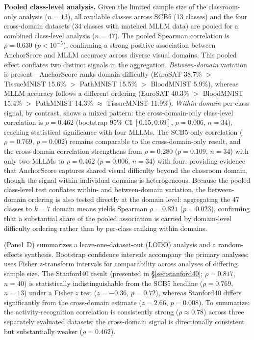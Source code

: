 \documentclass[a4paper,fleqn]{cas-sc}
\begin{document}
\textbf{Pooled class-level analysis.} Given the limited sample size of the classroom-only analysis ($n=13$), all available classes across SCB5 (13 classes) and the four cross-domain datasets (34 classes with matched MLLM data) are pooled for a combined class-level analysis ($n=47$). The pooled Spearman correlation is $\rho=0.630$ ($p<10^{-5}$), confirming a strong positive association between AnchorScore and MLLM accuracy across diverse visual domains. This pooled effect conflates two distinct signals in the aggregation. \emph{Between-domain} variation is present---AnchorScore ranks domain difficulty (EuroSAT 38.7\% $>$ TissueMNIST 15.6\% $>$ PathMNIST 15.5\% $>$ BloodMNIST 5.9\%), whereas MLLM accuracy follows a different ordering (EuroSAT 40.3\% $>$ BloodMNIST 15.4\% $>$ PathMNIST 14.3\% $\approx$ TissueMNIST 11.9\%). \emph{Within-domain} per-class signal, by contrast, shows a mixed pattern: the cross-domain-only class-level correlation is $\rho=0.462$ (bootstrap 95\% CI $[0.15, 0.69]$, $p=0.006$, $n=34$), reaching statistical significance with four MLLMs. The SCB5-only correlation ($\rho=0.769$, $p=0.002$) remains comparable to the cross-domain-only result, and the cross-domain correlation strengthens from $\rho=0.280$ ($p=0.109$, $n=34$) with only two MLLMs to $\rho=0.462$ ($p=0.006$, $n=34$) with four, providing evidence that AnchorScore captures shared visual difficulty beyond the classroom domain, though the signal within individual domains is heterogeneous. Because the pooled class-level test conflates within- and between-domain variation, the between-domain ordering is also tested directly at the domain level: aggregating the 47 classes to $k=7$ domain means yields Spearman $\rho=0.821$ ($p=0.023$), confirming that a substantial share of the pooled association is carried by domain-level difficulty ordering rather than by per-class ranking within domains.

 (Panel~D) summarizes a leave-one-dataset-out (LODO) analysis and a random-effects synthesis. Bootstrap confidence intervals accompany the primary analyses;  uses Fisher $z$-transform intervals for comparability across analyses of differing sample size. The Stanford40 result (presented in \S\ref{sec:stanford40}; $\rho=0.817$, $n=40$) is statistically indistinguishable from the SCB5 headline ($\rho=0.769$, $n=13$) under a Fisher $z$ test ($z=-0.36$, $p=0.72$), whereas Stanford40 differs significantly from the cross-domain estimate ($z=2.66$, $p=0.008$). To summarize: the activity-recognition correlation is consistently strong ($\rho\approx0.78$) across three separately evaluated datasets; the cross-domain signal is directionally consistent but substantially weaker ($\rho=0.462$).
\end{document}
